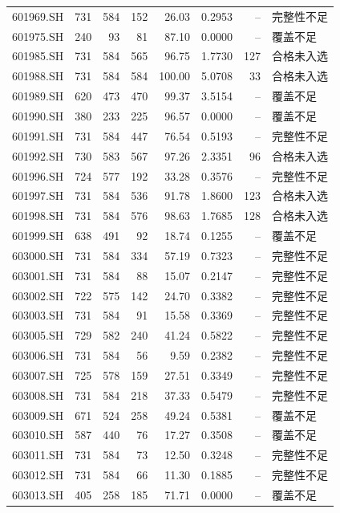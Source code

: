 \documentclass[10pt,a4paper]{article}
\begin{document}
\begin{longtable}{lrrr r r r l}
601969.SH & 731 & 584 & 152 & 26.03 & 0.2953 & -- & 完整性不足\\
601975.SH & 240 & 93 & 81 & 87.10 & 0.0000 & -- & 覆盖不足\\
601985.SH & 731 & 584 & 565 & 96.75 & 1.7730 & 127 & 合格未入选\\
601988.SH & 731 & 584 & 584 & 100.00 & 5.0708 & 33 & 合格未入选\\
601989.SH & 620 & 473 & 470 & 99.37 & 3.5154 & -- & 覆盖不足\\
601990.SH & 380 & 233 & 225 & 96.57 & 0.0000 & -- & 覆盖不足\\
601991.SH & 731 & 584 & 447 & 76.54 & 0.5193 & -- & 完整性不足\\
601992.SH & 730 & 583 & 567 & 97.26 & 2.3351 & 96 & 合格未入选\\
601996.SH & 724 & 577 & 192 & 33.28 & 0.3576 & -- & 完整性不足\\
601997.SH & 731 & 584 & 536 & 91.78 & 1.8600 & 123 & 合格未入选\\
601998.SH & 731 & 584 & 576 & 98.63 & 1.7685 & 128 & 合格未入选\\
601999.SH & 638 & 491 & 92 & 18.74 & 0.1255 & -- & 覆盖不足\\
603000.SH & 731 & 584 & 334 & 57.19 & 0.7323 & -- & 完整性不足\\
603001.SH & 731 & 584 & 88 & 15.07 & 0.2147 & -- & 完整性不足\\
603002.SH & 722 & 575 & 142 & 24.70 & 0.3382 & -- & 完整性不足\\
603003.SH & 731 & 584 & 91 & 15.58 & 0.3369 & -- & 完整性不足\\
603005.SH & 729 & 582 & 240 & 41.24 & 0.5822 & -- & 完整性不足\\
603006.SH & 731 & 584 & 56 & 9.59 & 0.2382 & -- & 完整性不足\\
603007.SH & 725 & 578 & 159 & 27.51 & 0.3349 & -- & 完整性不足\\
603008.SH & 731 & 584 & 218 & 37.33 & 0.5479 & -- & 完整性不足\\
603009.SH & 671 & 524 & 258 & 49.24 & 0.5381 & -- & 覆盖不足\\
603010.SH & 587 & 440 & 76 & 17.27 & 0.3508 & -- & 覆盖不足\\
603011.SH & 731 & 584 & 73 & 12.50 & 0.3248 & -- & 完整性不足\\
603012.SH & 731 & 584 & 66 & 11.30 & 0.1885 & -- & 完整性不足\\
603013.SH & 405 & 258 & 185 & 71.71 & 0.0000 & -- & 覆盖不足\\

\end{longtable}
\end{document}
